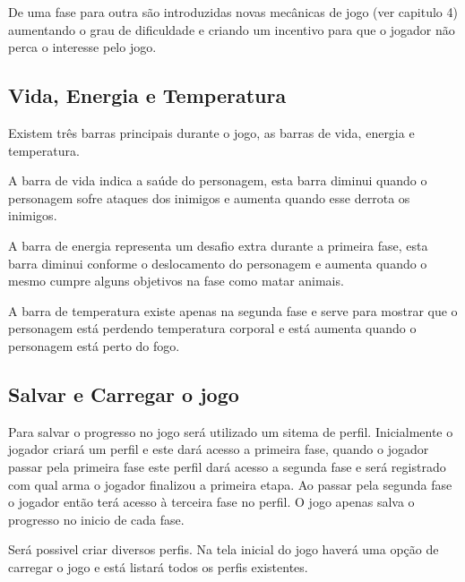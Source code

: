 De uma fase para outra são introduzidas novas mecânicas de jogo (ver capitulo 4) aumentando o
grau de dificuldade e criando um incentivo para que o jogador não perca o interesse pelo jogo.

\subsection {Vida, Energia e Temperatura}

Existem três barras principais durante o jogo, as barras de vida, energia e temperatura. 

A barra de vida indica a saúde do personagem, esta barra diminui quando
o personagem sofre ataques dos inimigos e aumenta quando esse derrota os
 inimigos.

A barra de energia representa um desafio extra durante a primeira fase, esta
 barra diminui conforme o deslocamento do personagem e aumenta quando o 
mesmo cumpre alguns objetivos na fase como matar animais.

A barra de temperatura existe apenas na segunda fase e serve para mostrar que
o personagem está perdendo temperatura corporal e está aumenta quando o personagem está perto do fogo.

\subsection {Salvar e Carregar o jogo}
Para salvar o progresso no jogo será utilizado um sitema de perfil. Inicialmente o jogador criará um perfil e este dará acesso 
a primeira fase, quando o jogador passar pela primeira fase este perfil dará acesso a segunda fase e será registrado com qual arma o jogador
finalizou a primeira etapa. Ao passar pela segunda fase o jogador então terá acesso à terceira fase no perfil. O jogo apenas salva o progresso 
no inicio de cada fase.

Será possivel criar diversos perfis. Na tela inicial do jogo haverá uma opção de carregar o jogo e está listará todos os perfis existentes.